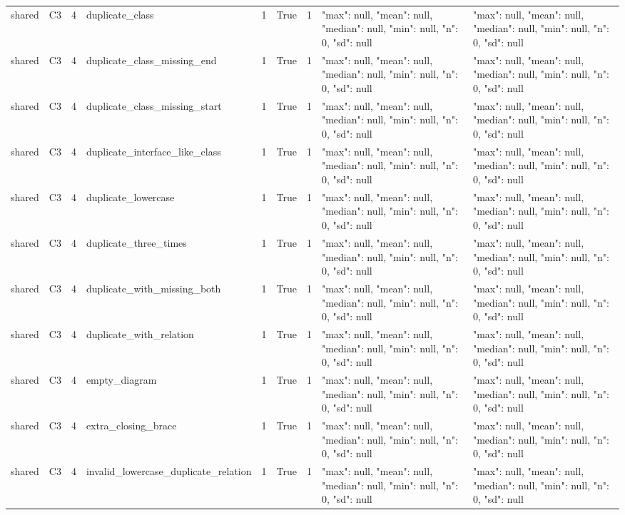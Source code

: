 \begin{tabular}{lllllllll}
shared & C3 & 4 & duplicate\_class & 1 & True & 1 & {"max": null, "mean": null, "median": null, "min": null, "n": 0, "sd": null} & {"max": null, "mean": null, "median": null, "min": null, "n": 0, "sd": null} \\
shared & C3 & 4 & duplicate\_class\_missing\_end & 1 & True & 1 & {"max": null, "mean": null, "median": null, "min": null, "n": 0, "sd": null} & {"max": null, "mean": null, "median": null, "min": null, "n": 0, "sd": null} \\
shared & C3 & 4 & duplicate\_class\_missing\_start & 1 & True & 1 & {"max": null, "mean": null, "median": null, "min": null, "n": 0, "sd": null} & {"max": null, "mean": null, "median": null, "min": null, "n": 0, "sd": null} \\
shared & C3 & 4 & duplicate\_interface\_like\_class & 1 & True & 1 & {"max": null, "mean": null, "median": null, "min": null, "n": 0, "sd": null} & {"max": null, "mean": null, "median": null, "min": null, "n": 0, "sd": null} \\
shared & C3 & 4 & duplicate\_lowercase & 1 & True & 1 & {"max": null, "mean": null, "median": null, "min": null, "n": 0, "sd": null} & {"max": null, "mean": null, "median": null, "min": null, "n": 0, "sd": null} \\
shared & C3 & 4 & duplicate\_three\_times & 1 & True & 1 & {"max": null, "mean": null, "median": null, "min": null, "n": 0, "sd": null} & {"max": null, "mean": null, "median": null, "min": null, "n": 0, "sd": null} \\
shared & C3 & 4 & duplicate\_with\_missing\_both & 1 & True & 1 & {"max": null, "mean": null, "median": null, "min": null, "n": 0, "sd": null} & {"max": null, "mean": null, "median": null, "min": null, "n": 0, "sd": null} \\
shared & C3 & 4 & duplicate\_with\_relation & 1 & True & 1 & {"max": null, "mean": null, "median": null, "min": null, "n": 0, "sd": null} & {"max": null, "mean": null, "median": null, "min": null, "n": 0, "sd": null} \\
shared & C3 & 4 & empty\_diagram & 1 & True & 1 & {"max": null, "mean": null, "median": null, "min": null, "n": 0, "sd": null} & {"max": null, "mean": null, "median": null, "min": null, "n": 0, "sd": null} \\
shared & C3 & 4 & extra\_closing\_brace & 1 & True & 1 & {"max": null, "mean": null, "median": null, "min": null, "n": 0, "sd": null} & {"max": null, "mean": null, "median": null, "min": null, "n": 0, "sd": null} \\
shared & C3 & 4 & invalid\_lowercase\_duplicate\_relation & 1 & True & 1 & {"max": null, "mean": null, "median": null, "min": null, "n": 0, "sd": null} & {"max": null, "mean": null, "median": null, "min": null, "n": 0, "sd": null} \\

\end{tabular}
